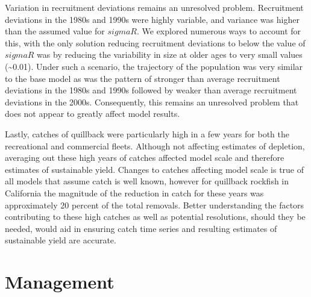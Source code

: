 \documentclass[11pt,
  english,
  a4paper,
]{article}
\begin{document}
Variation in recruitment deviations remains an unresolved problem. Recruitment deviations in the 1980s and 1990s were highly variable, and variance was higher than the assumed value for {\(sigmaR\)\leavevmode\tagmcend\tagstructend}. We explored numerous ways to account for this, with the only solution reducing recruitment deviations to below the value of {\(sigmaR\)\leavevmode\tagmcend\tagstructend} was by reducing the variability in size at older ages to very small values (\textasciitilde0.01). Under such a scenario, the trajectory of the population was very similar to the base model as was the pattern of stronger than average recruitment deviations in the 1980s and 1990s followed by weaker than average recruitment deviations in the 2000s. Consequently, this remains an unresolved problem that does not appear to greatly affect model results.

\leavevmode\tagmcend\tagstructend\par


Lastly, catches of quillback were particularly high in a few years for both the recreational and commercial fleets. Although not affecting estimates of depletion, averaging out these high years of catches affected model scale and therefore estimates of sustainable yield. Changes to catches affecting model scale is true of all models that assume catch is well known, however for quillback rockfish in California the magnitude of the reduction in catch for these years was approximately 20 percent of the total removals. Better understanding the factors contributing to these high catches as well as potential resolutions, should they be needed, would aid in ensuring catch time series and resulting estimates of sustainable yield are accurate.

\leavevmode\tagmcend\tagstructend\par


\hypertarget{management}{%
\section{Management}\label{management}}

\leavevmode\tagmcend\tagstructend

\end{document}
